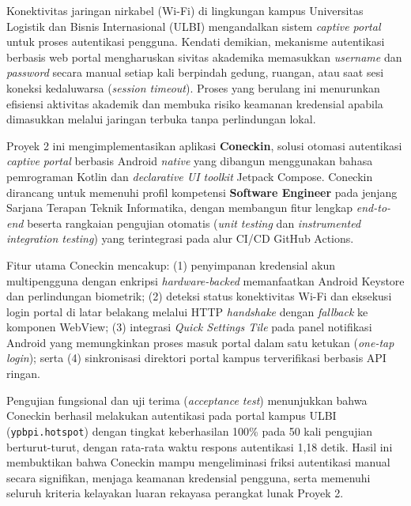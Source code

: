 Konektivitas jaringan nirkabel (Wi-Fi) di lingkungan kampus Universitas Logistik dan Bisnis Internasional (ULBI) mengandalkan sistem \textit{captive portal} untuk proses autentikasi pengguna. Kendati demikian, mekanisme autentikasi berbasis web portal mengharuskan sivitas akademika memasukkan \textit{username} dan \textit{password} secara manual setiap kali berpindah gedung, ruangan, atau saat sesi koneksi kedaluwarsa (\textit{session timeout}). Proses yang berulang ini menurunkan efisiensi aktivitas akademik dan membuka risiko keamanan kredensial apabila dimasukkan melalui jaringan terbuka tanpa perlindungan lokal.

Proyek 2 ini mengimplementasikan aplikasi \textbf{Coneckin}, solusi otomasi autentikasi \textit{captive portal} berbasis Android \textit{native} yang dibangun menggunakan bahasa pemrograman Kotlin dan \textit{declarative UI toolkit} Jetpack Compose. Coneckin dirancang untuk memenuhi profil kompetensi \textbf{Software Engineer} pada jenjang Sarjana Terapan Teknik Informatika, dengan membangun fitur lengkap \textit{end-to-end} beserta rangkaian pengujian otomatis (\textit{unit testing} dan \textit{instrumented integration testing}) yang terintegrasi pada alur CI/CD GitHub Actions.

Fitur utama Coneckin mencakup: (1) penyimpanan kredensial akun multipengguna dengan enkripsi \textit{hardware-backed} memanfaatkan Android Keystore dan perlindungan biometrik; (2) deteksi status konektivitas Wi-Fi dan eksekusi login portal di latar belakang melalui HTTP \textit{handshake} dengan \textit{fallback} ke komponen WebView; (3) integrasi \textit{Quick Settings Tile} pada panel notifikasi Android yang memungkinkan proses masuk portal dalam satu ketukan (\textit{one-tap login}); serta (4) sinkronisasi direktori portal kampus terverifikasi berbasis API ringan.

Pengujian fungsional dan uji terima (\textit{acceptance test}) menunjukkan bahwa Coneckin berhasil melakukan autentikasi pada portal kampus ULBI (\texttt{ypbpi.hotspot}) dengan tingkat keberhasilan 100\% pada 50 kali pengujian berturut-turut, dengan rata-rata waktu respons autentikasi 1,18 detik. Hasil ini membuktikan bahwa Coneckin mampu mengeliminasi friksi autentikasi manual secara signifikan, menjaga keamanan kredensial pengguna, serta memenuhi seluruh kriteria kelayakan luaran rekayasa perangkat lunak Proyek 2.
